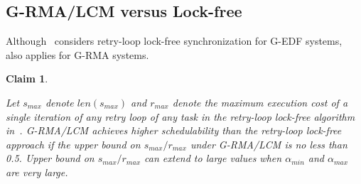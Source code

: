 \documentclass[12pt,english]{report}
\newtheorem{clm}{Claim}
\begin{document}
\subsection{G-RMA/LCM versus Lock-free}\label{g-rma lcm vs lock-free}

Although~\cite{key-5} considers retry-loop lock-free synchronization
for G-EDF systems,~\cite{key-5} also applies for G-RMA systems.

\begin{clm}\label{lcm rma lock-free comparison clm}

Let $s_{max}$ denote $len(s_{max})$ and $r_{max}$ denote the maximum
execution cost of a single iteration of any retry loop of any task
in the retry-loop lock-free algorithm in~\cite{key-5}. G-RMA/LCM
achieves higher schedulability than the retry-loop lock-free approach
if the upper bound on $s_{max}/r_{max}$ under G-RMA/LCM is no less
than 0.5. Upper bound on $s_{max}/r_{max}$ can extend to large values
when $\alpha_{min}$ and $\alpha_{max}$ are very large.

\end{clm}
\end{document}
